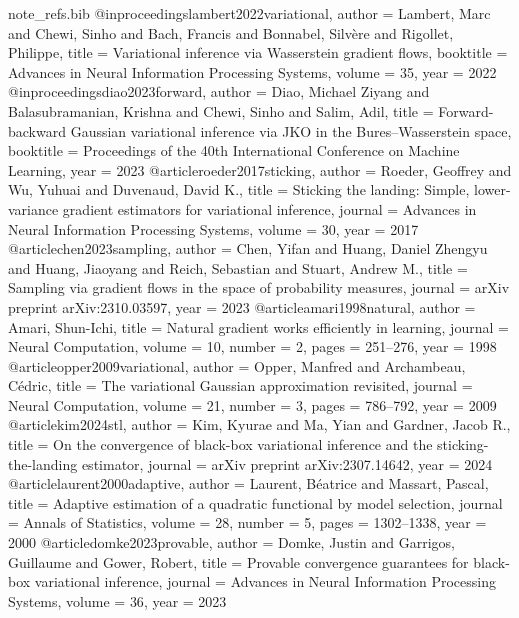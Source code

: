 \begin{filecontents*}[overwrite]{note_refs.bib}
@inproceedings{lambert2022variational,
  author    = {Lambert, Marc and Chewi, Sinho and Bach, Francis and Bonnabel, Silv\`ere and Rigollet, Philippe},
  title     = {Variational inference via {W}asserstein gradient flows},
  booktitle = {Advances in Neural Information Processing Systems},
  volume    = {35},
  year      = {2022}
}
@inproceedings{diao2023forward,
  author    = {Diao, Michael Ziyang and Balasubramanian, Krishna and Chewi, Sinho and Salim, Adil},
  title     = {Forward-backward {G}aussian variational inference via {JKO} in the {B}ures--{W}asserstein space},
  booktitle = {Proceedings of the 40th International Conference on Machine Learning},
  year      = {2023}
}
@article{roeder2017sticking,
  author  = {Roeder, Geoffrey and Wu, Yuhuai and Duvenaud, David K.},
  title   = {Sticking the landing: Simple, lower-variance gradient estimators for variational inference},
  journal = {Advances in Neural Information Processing Systems},
  volume  = {30},
  year    = {2017}
}
@article{chen2023sampling,
  author  = {Chen, Yifan and Huang, Daniel Zhengyu and Huang, Jiaoyang and Reich, Sebastian and Stuart, Andrew M.},
  title   = {Sampling via gradient flows in the space of probability measures},
  journal = {arXiv preprint arXiv:2310.03597},
  year    = {2023}
}
@article{amari1998natural,
  author  = {Amari, Shun-Ichi},
  title   = {Natural gradient works efficiently in learning},
  journal = {Neural Computation},
  volume  = {10},
  number  = {2},
  pages   = {251--276},
  year    = {1998}
}
@article{opper2009variational,
  author  = {Opper, Manfred and Archambeau, C\'edric},
  title   = {The variational {G}aussian approximation revisited},
  journal = {Neural Computation},
  volume  = {21},
  number  = {3},
  pages   = {786--792},
  year    = {2009}
}
@article{kim2024stl,
  author  = {Kim, Kyurae and Ma, Yian and Gardner, Jacob R.},
  title   = {On the convergence of black-box variational inference and the sticking-the-landing estimator},
  journal = {arXiv preprint arXiv:2307.14642},
  year    = {2024}
}
@article{laurent2000adaptive,
  author  = {Laurent, B{\'e}atrice and Massart, Pascal},
  title   = {Adaptive estimation of a quadratic functional by model selection},
  journal = {Annals of Statistics},
  volume  = {28},
  number  = {5},
  pages   = {1302--1338},
  year    = {2000}
}
@article{domke2023provable,
  author  = {Domke, Justin and Garrigos, Guillaume and Gower, Robert},
  title   = {Provable convergence guarantees for black-box variational inference},
  journal = {Advances in Neural Information Processing Systems},
  volume  = {36},
  year    = {2023}
}
\end{filecontents*}

